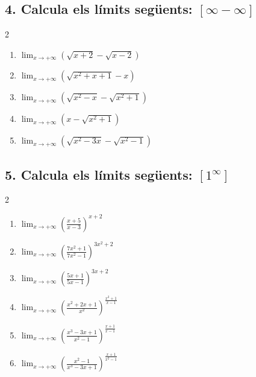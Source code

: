 \documentclass[12pt,a4paper]{article}
\begin{document}
\subsection*{4. Calcula els límits següents: $[\infty - \infty]$}
\begin{multicols}{2}
\begin{enumerate}[label=4.\arabic*.]
    \item $\displaystyle \lim_{x \to +\infty} \left(\sqrt{x+2}-\sqrt{x-2}\right)$
    \item $\displaystyle \lim_{x \to +\infty} \left(\sqrt{x^2+x+1}-x\right)$
    \item $\displaystyle \lim_{x \to +\infty} \left(\sqrt{x^2-x}-\sqrt{x^2+1}\right)$
    \item $\displaystyle \lim_{x \to +\infty} \left(x-\sqrt{x^2+1}\right)$
    \item $\displaystyle \lim_{x \to +\infty} \left(\sqrt{x^2-3x}-\sqrt{x^2-1}\right)$
\end{enumerate}
\end{multicols}

\subsection*{5. Calcula els límits següents: $\left[1^{\infty}\right]$}
\begin{multicols}{2}
\begin{enumerate}[label=5.\arabic*.]
    \item $\displaystyle \lim_{x \to +\infty}
          \left(\frac{x+5}{x-3}\right)^{\!x+2}$
    \item $\displaystyle \lim_{x \to +\infty}
          \left(\frac{7x^2+1}{7x^2-1}\right)^{\!3x^2+2}$
    \item $\displaystyle \lim_{x \to +\infty}
          \left(\frac{5x+1}{5x-1}\right)^{\!3x+2}$
    \item $\displaystyle \lim_{x \to +\infty}
          \left(\frac{x^2+2x+1}{x^2}\right)^{\!\frac{x^2+1}{x-1}}$
    \item $\displaystyle \lim_{x \to +\infty}
          \left(\frac{x^3-3x+1}{x^2-1}\right)^{\!\frac{x+1}{x-1}}$
    \item $\displaystyle \lim_{x \to +\infty}
          \left(\frac{x^2-1}{x^3-3x+1}\right)^{\!\frac{x+1}{x^2-1}}$
\end{enumerate}
\end{multicols}
\end{document}
